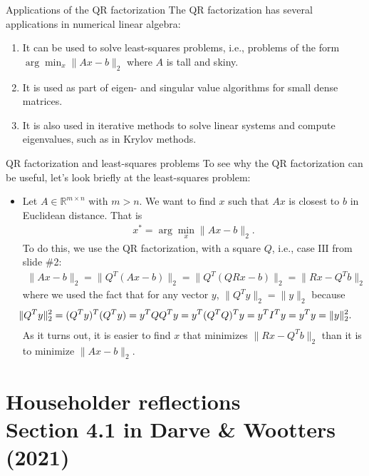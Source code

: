 \documentclass[t,usepdftitle=false]{beamer}
\begin{document}
\begin{frame}{Applications of the QR factorization}
The QR factorization has several applications in numerical linear algebra:
\begin{enumerate}
\item It can be used to solve least-squares problems, i.e., problems of the form $\arg\min_x\|Ax-b\|_2$ where $A$ is tall and skiny.
\item It is used as part of eigen- and singular value algorithms for small dense matrices.
\item It is also used in iterative methods to solve linear systems and compute eigenvalues, such as in Krylov methods.
\end{enumerate}
\end{frame}

\begin{frame}{QR factorization and least-squares problems}
To see why the QR factorization can be useful, let's look briefly at the least-squares problem:
\begin{itemize}
\item Let $A\in\mathbb{R}^{m\times n}$ with $m>n$.
We want to find $x$ such that $Ax$ is closest to $b$ in Euclidean distance.
That is 
\begin{align*}
x^*=\arg\min_x\|Ax-b\|_2.
\end{align*}
To do this, we use the QR factorization, with a square $Q$, i.e., case $\mathrm{III}$ from slide \#2:
\begin{align*}
\|Ax-b\|_2=
\|Q^T(Ax-b)\|_2=
\|Q^T(QRx-b)\|_2=
\|Rx-Q^Tb\|_2
\end{align*}
where we used the fact that for any vector $y$, $\|Q^Ty\|_2=\|y\|_2$ because
\begin{align*}
\hspace{-.6cm}\|Q^Ty\|^2_2=(Q^Ty)^T(Q^Ty)=y^TQQ^Ty=y^T(Q^TQ)^Ty=y^TI^Ty=y^Ty=\|y\|_2^2.
\end{align*}
As it turns out, it is easier to find $x$ that minimizes $\|Rx-Q^Tb\|_2$ than it is to minimize $\|Ax-b\|_2$.
\end{itemize}
\end{frame}

\section{Householder reflections\\{\small Section 4.1 in Darve \& Wootters (2021)}}
\end{document}

